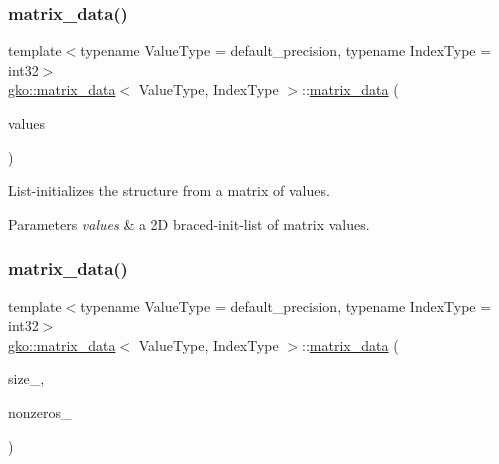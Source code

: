 \subsubsection{\texorpdfstring{matrix\+\_\+data()}{matrix\_data()}\hspace{0.1cm}{\footnotesize\ttfamily [3/6]}}
{\footnotesize\ttfamily template$<$typename Value\+Type = default\+\_\+precision, typename Index\+Type = int32$>$ \\
\hyperlink{structgko_1_1matrix__data}{gko\+::matrix\+\_\+data}$<$ Value\+Type, Index\+Type $>$\+::\hyperlink{structgko_1_1matrix__data}{matrix\+\_\+data} (\begin{DoxyParamCaption}\item[{std\+::initializer\+\_\+list$<$ std\+::initializer\+\_\+list$<$ Value\+Type $>$$>$}]{values }\end{DoxyParamCaption})\hspace{0.3cm}{\ttfamily [inline]}}



List-\/initializes the structure from a matrix of values. 


\begin{DoxyParams}{Parameters}
{\em values} & a 2D braced-\/init-\/list of matrix values. \\
\hline
\end{DoxyParams}
\mbox{\label{structgko_1_1matrix__data_a80074a1ab496f2332b126407de533e76}} 
\subsubsection{\texorpdfstring{matrix\+\_\+data()}{matrix\_data()}\hspace{0.1cm}{\footnotesize\ttfamily [4/6]}}
{\footnotesize\ttfamily template$<$typename Value\+Type = default\+\_\+precision, typename Index\+Type = int32$>$ \\
\hyperlink{structgko_1_1matrix__data}{gko\+::matrix\+\_\+data}$<$ Value\+Type, Index\+Type $>$\+::\hyperlink{structgko_1_1matrix__data}{matrix\+\_\+data} (\begin{DoxyParamCaption}\item[{\hyperlink{structgko_1_1dim}{dim}$<$ 2 $>$}]{size\+\_\+,  }\item[{std\+::initializer\+\_\+list$<$ detail\+::input\+\_\+triple$<$ Value\+Type, Index\+Type $>$$>$}]{nonzeros\+\_\+ }\end{DoxyParamCaption})\hspace{0.3cm}{\ttfamily [inline]}}



